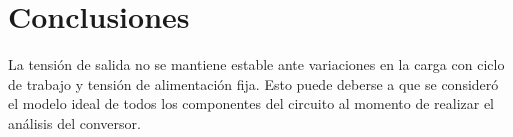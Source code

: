 \section{Conclusiones}


La tensión de salida no se mantiene estable ante variaciones en la carga con ciclo de trabajo y tensión de alimentación fija. 
Esto puede deberse a que se consideró el modelo ideal de todos los componentes del circuito al momento de realizar el análisis del conversor. 